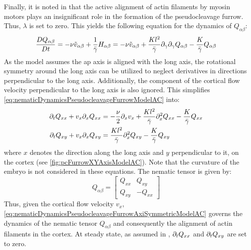 Finally, it is noted in \cite{reymann2016cortical} that the active alignment of actin filaments by myosin motors plays an insignificant role in the formation of the pseudocleavage furrow. Thus, $\lambda$ is set to zero. This yields the following equation for the dynamics of $Q_{\alpha\beta}$:
\begin{equation}\label{eq:nematicDynamicsPseudocleavageFurrowModelAC}
    \frac{DQ_{\alpha\beta}}{Dt} = -\nu \Tilde{v}_{\alpha\beta} + \frac{1}{\bar{\gamma}}H_{\alpha\beta} = -\nu \Tilde{v}_{\alpha\beta} + \frac{Kl^2}{\bar{\gamma}}\inlinePartial{\gamma}{\inlinePartial{\gamma}{Q_{\alpha\beta}}} - \frac{K}{\bar{\gamma}}Q_{\alpha\beta}
\end{equation}
As the model assumes the \ac{ap} axis is aligned with the long axis, the rotational symmetry around the long axis can be utilized to neglect derivatives in directions perpendicular to the long axis. Additionally, the component of the cortical flow velocity perpendicular to the long axis is also ignored. This simplifies \autoref{eq:nematicDynamicsPseudocleavageFurrowModelAC} into:
\begin{subequations}\label{eq:nematicDynamicsPseudocleavageFurrowAxiSymmetricModelAC}
    \begin{align}
        \inlinePartial{t}{Q_{xx}} + v_x\inlinePartial{x}{Q_{xx}} &=  -\frac{\nu}{2}\inlinePartial{x}{v_x} + \frac{Kl^2}{\bar{\gamma}}\inlinePartial[2]{x}{Q_{xx}} - \frac{K}{\bar{\gamma}}Q_{xx}\\
        \inlinePartial{t}{Q_{xy}} + v_x\inlinePartial{x}{Q_{xy}} &=  \frac{Kl^2}{\bar{\gamma}}\inlinePartial[2]{x}{Q_{xy}} - \frac{K}{\bar{\gamma}}Q_{xy}
    \end{align}
\end{subequations}
where $x$ denotes the direction along the long axis and $y$ perpendicular to it, on the cortex (see \autoref{fig:pcFurrowXYAxisModelAC}). Note that the curvature of the embryo is not considered in these equations. The nematic tensor is given by:
\begin{equation}
    Q_{\alpha\beta} = \begin{bmatrix} Q_{xx} & Q_{xy}\\ Q_{xy} & -Q_{xx} \end{bmatrix}
\end{equation}
Thus, given the cortical flow velocity $v_x$, \autoref{eq:nematicDynamicsPseudocleavageFurrowAxiSymmetricModelAC} governs the dynamics of the nematic tensor $Q_{\alpha\beta}$ and consequently the alignment of actin filaments in the cortex. At steady state, as assumed in \citep{reymann2016cortical}, $\inlinePartial{t}{Q_{xx}}$ and $\inlinePartial{t}{Q_{xy}}$ are set to zero.

